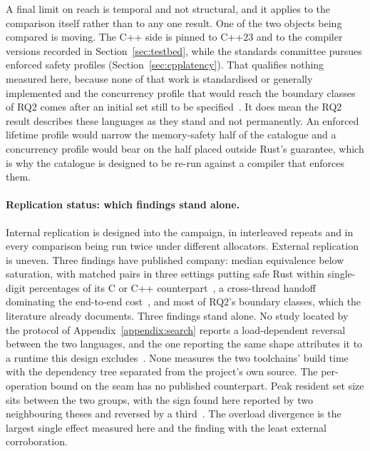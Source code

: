\documentclass[english,oneside,a4paper,censored,csm,software-track-2020]{HYthesisML}
\begin{document}
A final limit on reach is temporal and not structural, and it applies to the comparison
itself rather than to any one result. One of the two objects being compared is moving. The C++
side is pinned to C++23 and to the compiler versions recorded in
Section~\ref{sec:testbed}, while the standards committee pursues enforced safety
profiles (Section~\ref{sec:cpplatency}). That qualifies nothing measured here, because
none of that work is standardised or generally implemented and the concurrency profile that
would reach the boundary classes of RQ2 comes after an initial set still to be
specified~\cite{vandevoorde2026profiles}. It does mean the RQ2 result describes these languages
as they stand and not permanently. An enforced lifetime profile would narrow the memory-safety
half of the catalogue and a concurrency profile would bear on the half placed outside Rust's
guarantee, which is why the catalogue is designed to be re-run against a compiler that enforces
them.

\paragraph{Replication status: which findings stand alone.}
Internal replication is designed into the campaign, in \NRepeats{} interleaved repeats and in
every comparison being run twice under different allocators. External replication is uneven. Three
findings have published company: median equivalence below saturation, with matched pairs in three
settings putting safe Rust within single-digit percentages of its C or C++
counterpart~\cite{emmerich2019drivers,li2021ipc,gonzalez2023rustudp}, a cross-thread handoff
dominating the end-to-end cost~\cite{zhou2025oltp}, and most of RQ2's boundary classes, which the
literature already documents. Three findings stand alone. No study located by the protocol of
Appendix~\ref{appendix:search} reports a load-dependent reversal between the two languages, and the
one reporting the same shape attributes it to a runtime this design
excludes~\cite{arvidsson2025async}. None measures the two toolchains' build time with the
dependency tree separated from the project's own source. The per-operation bound on the seam has
no published counterpart. Peak resident set size sits between the two groups, with the sign
found here reported by two neighbouring theses and reversed by a
third~\cite{olsson2023ranmgmt,sundvisson2026drivers,karlback2021ran}. The overload divergence is
the largest single effect measured here and the finding with the least external corroboration.
\end{document}
